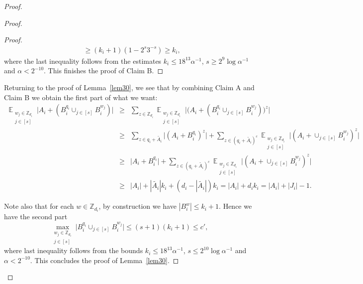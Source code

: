 \documentclass[12pt,reqno]{amsart}
\DeclareMathOperator*{\E}{\mathbb{E}}
\theoremstyle{definition}
\renewcommand\leq{\leqslant}
\renewcommand\geq{\geqslant}
\begin{document}
\begin{proof}
\begin{proof}
\begin{proof}
\begin{equation*}
\begin{split}
    &\geq (k_i+1)(1-2^{s}3^{-s}) \geq k_i,
\end{split}
\end{equation*}
where the last inequality follows from the estimates $k_i \leq 18^{13}\alpha^{-1}$, $s\geq 2^9\log \alpha^{-1}$ and $\alpha <2^{-{10}}$.
This finishes the proof of Claim B.
\end{proof}

Returning to the proof of Lemma~\ref{lem30}, we see that by
combining Claim A and Claim B we obtain the first part of what we want:
\begin{eqnarray*}
    \E_{\substack{w_j \in \mathbb{Z}_{d_i} \\ j\in[s] }} \bigg|A_i+(B_i^{q_i}\cup_{j\in [s]} B_i^{w_j}) \bigg| &\geq&     \sum_{z\in \mathbb{Z}_{d_i}}\E_{\substack{w_j \in \mathbb{Z}_{d_i} \\ j\in[s] }} \bigg|\bigg(A_i+(B_i^{q_i}\cup_{j\in [s]} B_i^{w_j})\bigg)^z \bigg|\\
    &\geq& \sum_{z\in q_i+\widetilde{A_i}} \bigg|(A_i+B_i^{q_i})^z \bigg|+\sum_{z\in (q_i+\widetilde{A_i})^c}\E_{\substack{w_j \in \mathbb{Z}_{d_i} \\ j\in[s] }} \bigg|(A_i+\cup_{j\in [s]} B_i^{w_j})^z \bigg|\\
    &\geq& \bigg|A_i+B_i^{q_i} \bigg|+\sum_{z\in (q_i+\widetilde{A_i})^c}\E_{\substack{w_j \in \mathbb{Z}_{d_i} \\ j\in[s] }} \bigg|(A_i+\cup_{j\in [s]} B_i^{w_j})^z \bigg|\\
    &\geq& |A_i|+|\widetilde{A_i}|k_i+(d_i-|\widetilde{A_i}|)k_i = |A_i|+d_ik_i=|A_i|+|J_i|-1.
\end{eqnarray*}

\vspace{3pt}
\noindent
Note also that for each $w\in \mathbb{Z}_{d_i}$, by construction we have
$|B_i^w| \leq k_i+1.$
Hence we have the second part
\begin{equation*}
    \max_{\substack{w_j \in \mathbb{Z}_{d_i} \\ j\in[s] }} \bigg|B_i^{q_i}\cup_{j\in [s]} B_i^{w_j} \bigg| \leq (s+1)(k_i+1) \leq c',
\end{equation*}
where last inequality follows from the bounds $k_i \leq 18^{13}\alpha^{-1}$, $s\leq 2^{10}\log \alpha^{-1}$ and $\alpha <2^{-{10}}$.
This concludes the proof of Lemma~\ref{lem30}.
\end{proof}



\end{proof}
\end{document}
